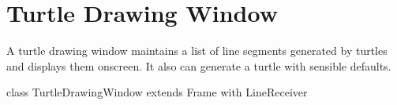 \documentclass{article}
\begin{document}
  \section{Turtle Drawing Window}
    \label{sec:turtle-drawing-window}

    A turtle drawing window maintains a list of line segments generated by turtles and displays them onscreen. It also can generate a turtle with sensible
    defaults.

    \begin{scalacode}
class TurtleDrawingWindow extends Frame with LineReceiver {
}
    \end{scalacode}

\end{document}
